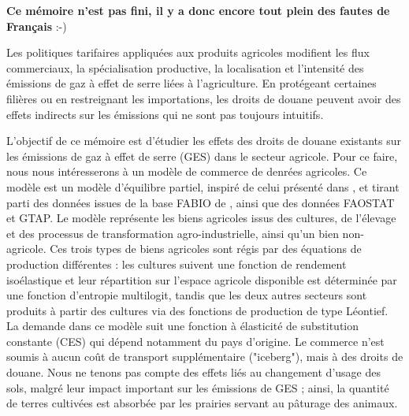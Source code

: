 \textbf{Ce mémoire n'est pas fini, il y a donc encore tout plein des fautes de Français} :-)

Les politiques tarifaires appliquées aux produits agricoles modifient les flux commerciaux, la spécialisation productive, la localisation et l'intensité des émissions de gaz à effet de serre liées à l'agriculture. En protégeant certaines filières ou en restreignant les importations, les droits de douane peuvent avoir des effets indirects sur les émissions qui ne sont pas toujours intuitifs.

L'objectif de ce mémoire est d'étudier les effets des droits de douane existants sur les émissions de gaz à effet de serre (GES) dans le secteur agricole. Pour ce faire, nous nous intéresserons à un modèle de commerce de denrées agricoles. Ce modèle est un modèle d'équilibre partiel, inspiré de celui présenté dans \cite{Gouel2021}, et tirant parti des données issues de la base FABIO de \cite{Bruckner2019}, ainsi que des données FAOSTAT et GTAP. Le modèle représente les biens agricoles issus des cultures, de l'élevage et des processus de transformation agro-industrielle, ainsi qu'un bien non-agricole. Ces trois types de biens agricoles sont régis par des équations de production différentes : les cultures suivent une fonction de rendement isoélastique et leur répartition sur l'espace agricole disponible est déterminée par une fonction d'entropie multilogit, tandis que les deux autres secteurs sont produits à partir des cultures via des fonctions de production de type Léontief. La demande dans ce modèle suit une fonction à élasticité de substitution constante (CES) qui dépend notamment du pays d'origine. Le commerce n'est soumis à aucun coût de transport supplémentaire ("iceberg"), mais à des droits de douane. Nous ne tenons pas compte des effets liés au changement d'usage des sols, malgré leur impact important sur les émissions de GES ; ainsi, la quantité de terres cultivées est absorbée par les prairies servant au pâturage des animaux.

